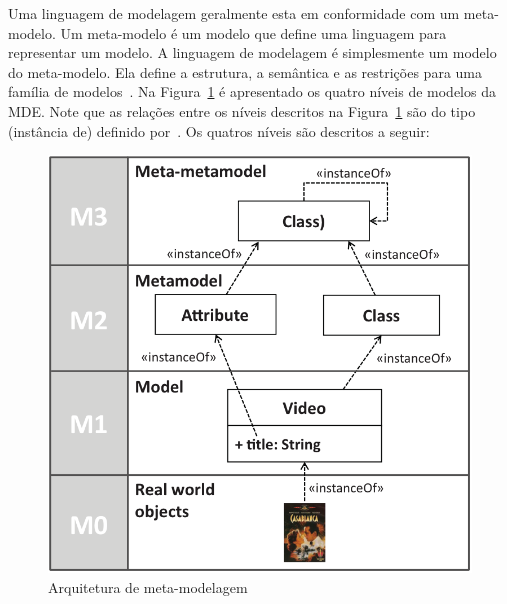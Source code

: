 Uma linguagem de modelagem geralmente esta em conformidade com um meta-modelo. Um meta-modelo é um modelo que define uma linguagem para representar um modelo. A linguagem de modelagem é simplesmente um modelo do meta-modelo. Ela define a estrutura, a semântica e as restrições para uma família de modelos~\cite{Mellor_2004}. Na Figura~\ref{fig:metamodelosCamadas} é apresentado os quatro níveis de modelos da MDE. Note que as relações entre os níveis descritos na Figura~\ref{fig:metamodelosCamadas} são do tipo  (instância de) definido por~. Os quatros níveis são descritos a seguir: 

\begin{figure}[htb]
 \caption{Arquitetura de meta-modelagem}
 \label{fig:metamodelosCamadas}
 \centering
 \includegraphics[scale=0.3]{images/models_notions}
\end{figure}

